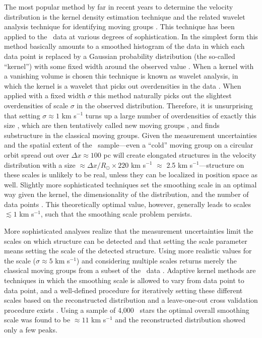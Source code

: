 The most popular method by far in recent years to determine the
 velocity distribution is the kernel density estimation technique
 \citep{Silverman86a} and the related wavelet analysis technique for
 identifying moving groups \citep[\eg,][]{1990A&A...227..301S}. This
 technique has been applied to the \Hipparcos\ data at various degrees
 of sophistication. In the simplest form this method basically amounts
 to a smoothed histogram of the data in which each data point is
 replaced by a Gaussian probability distribution (the so-called
 ``kernel'') with some fixed width around the observed value
 \citep{1997A&A...318...29C}. When a kernel with a vanishing volume is
 chosen this technique is known as wavelet analysis, in which the
 kernel is a wavelet that picks out overdensities in the data
 \citep[\eg, a ``Mexican hat'' wavelet,][]{1989wtfm.conf..239M}. When
 applied with a fixed width $\sigma$ this method naturally picks out
 the slightest overdensities of scale $\sigma$ in the observed
 distribution. Therefore, it is unsurprising that setting $\sigma
 \approx 1$ km s$^{-1}$ turns up a large number of overdensities of
 exactly this size \citep{2009arXiv0901.3503F}, which are then
 tentatively called new moving groups \citep{2009ApJ...692L.113Z}, and
 finds substructure in the classical moving groups. Given the
 measurement uncertainties and the spatial extent of the \Hipparcos\
 sample---even a ``cold'' moving group on a circular orbit spread out
 over $\Delta x\approx 100$ pc will create elongated structures in the
 velocity distribution with a size $\approx \Delta x/R_\odot \times
 220$ km s$^{-1}$ $\approx$ 2.5 km s$^{-1}$---structure on these
 scales is unlikely to be real, unless they can be localized in
 position space as well. Slightly more sophisticated techniques set
 the smoothing scale in an optimal way given the kernel, the
 dimensionality of the distribution, and the number of data points
 \citep{1990A&A...235...94C,1999A&A...341..427A}. This theoretically
 optimal value, however, generally leads to scales $\lesssim 1$ km
 s$^{-1}$, such that the smoothing scale problem persists.

More sophisticated analyses realize that the measurement uncertainties
limit the scales on which structure can be detected and that setting
the scale parameter means setting the scale of the detected
structure. Using more realistic values for the scale ($\sigma \approx
5$ km s$^{-1}$) and considering multiple scales returns merely the
classical moving groups from a subset of the \Hipparcos\ data
\citep{1997ESASP.402..519F}. Adaptive kernel methods are techniques in
which the smoothing scale is allowed to vary from data point to data
point, and a well-defined procedure for iteratively setting these
different scales based on the reconstructed distribution and a
leave-one-out cross validation procedure exists
\citep{Silverman86a}. Using a sample of 4,000 \Hipparcos\ stars the
optimal overall smoothing scale was found to be $\approx 11$ km
s$^{-1}$ \citep{1999MNRAS.308..731S} and the reconstructed
distribution showed only a few peaks.


